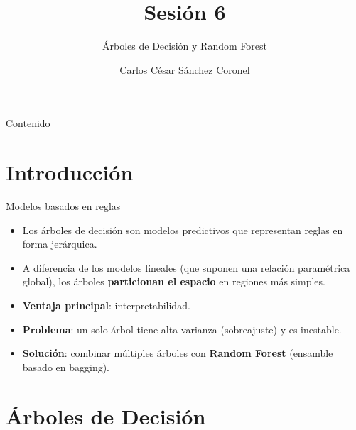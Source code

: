 \documentclass[aspectratio=169, 10pt, xcolor=table]{beamer}
\title[SESIÓN 6]{\textbf{Sesión 6}}
\subtitle{Árboles de Decisión y Random Forest}
\author[Prof. C. Sánchez]{Carlos César Sánchez Coronel}
\institute{\textbf{MACHINE LEARNING}}
\date{}
\begin{document}
\begin{frame}
    \titlepage
\end{frame}

\begin{frame}{Contenido}
    \tableofcontents
\end{frame}

\section{Introducción}

\begin{frame}{Modelos basados en reglas}
    \begin{itemize}
        \item Los árboles de decisión son modelos predictivos que representan reglas en forma jerárquica.
        \item A diferencia de los modelos lineales (que suponen una relación paramétrica global), los árboles \textbf{particionan el espacio} en regiones más simples.
        \item \textbf{Ventaja principal}: interpretabilidad.
        \item \textbf{Problema}: un solo árbol tiene alta varianza (sobreajuste) y es inestable.
        \item \textbf{Solución}: combinar múltiples árboles con \textbf{Random Forest} (ensamble basado en bagging).
    \end{itemize}
\end{frame}

\section{Árboles de Decisión}
\end{document}
